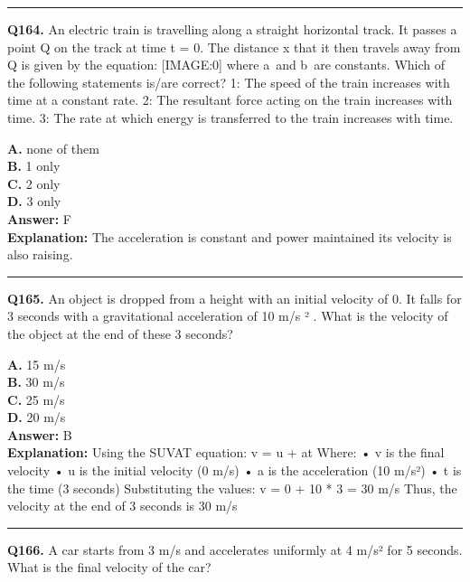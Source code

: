 \documentclass[12pt]{article}
\begin{document}
\hrule
\vspace{1em}


\noindent
\textbf{Q164.} An electric train is travelling along a straight horizontal track. It passes a point Q on the track at time t = 0. The distance x that it then travels away from Q is given by the equation:
[IMAGE:0]
where a and b are constants.
Which of the following statements is/are correct?
1: The speed of the train increases with time at a constant rate.
2: The resultant force acting on the train increases with time.
3: The rate at which energy is transferred to the train increases with time.



\textbf{A.} none of them \\
\textbf{B.} 1 only \\
\textbf{C.} 2 only \\
\textbf{D.} 3 only \\

\textbf{Answer:} F \\
\textbf{Explanation:} The acceleration is constant and power maintained its velocity is also raising.

\hrule
\vspace{1em}


\noindent
\textbf{Q165.} An object is dropped from a height with an initial velocity of 0. It falls for 3 seconds with a gravitational acceleration of 10 m/s
²
. What is the velocity of the object at the end of these 3 seconds?



\textbf{A.} 15 m/s \\
\textbf{B.} 30 m/s \\
\textbf{C.} 25 m/s \\
\textbf{D.} 20 m/s \\

\textbf{Answer:} B \\
\textbf{Explanation:} Using the SUVAT equation: v = u + at Where:
• v is the final velocity
• u is the initial velocity (0 m/s)
• a is the acceleration (10 m/s²)
• t is the time (3 seconds) Substituting the values: v = 0 + 10 * 3 = 30 m/s Thus, the velocity at the end of 3 seconds is 30 m/s

\hrule
\vspace{1em}


\noindent
\textbf{Q166.} A car starts from 3 m/s and accelerates uniformly at 4 m/s² for 5 seconds. What is the final velocity of the car?
\end{document}
